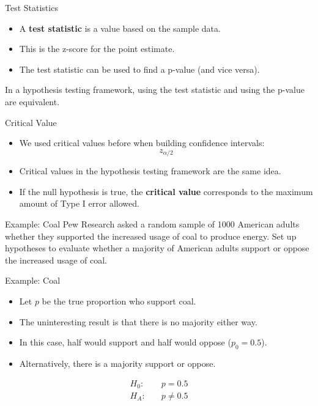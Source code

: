 \begin{frame}{Test Statistics}
    \begin{itemize}
        \item A \textbf{test statistic} is a value based on the sample data.
        \item This is the z-score for the point estimate.
        \item The test statistic can be used to find a p-value (and vice versa).
    \end{itemize}
    In a hypothesis testing framework, using the test statistic and using the p-value are equivalent. 
\end{frame}

\begin{frame}{Critical Value}
    \begin{itemize}
        \item We used critical values before when building confidence intervals:
        \[
            z_{\alpha/2}
        \]
        \item Critical values in the hypothesis testing framework are the same idea.
        \item If the null hypothesis is true, the \textbf{critical value} corresponds to the maximum amount of Type I error allowed. 
    \end{itemize}
\end{frame}

\begin{frame}{Example: Coal}
    Pew Research asked a random sample of 1000 American adults whether they supported the increased usage of coal to produce energy. Set up hypotheses to evaluate whether a majority of American adults support or oppose the increased usage of coal.
\end{frame}

\begin{frame}{Example: Coal}
    \begin{itemize}
        \item Let $p$ be the true proportion who support coal.
        \item The uninteresting result is that there is no majority either way.
        \item In this case, half would support and half would oppose ($p_0=0.5$).
        \item Alternatively, there is a majority support or oppose.
    \end{itemize}
    \begin{align*}
        H_0: &\quad p = 0.5 \\
        H_A: &\quad p \ne 0.5
    \end{align*}
\end{frame}

